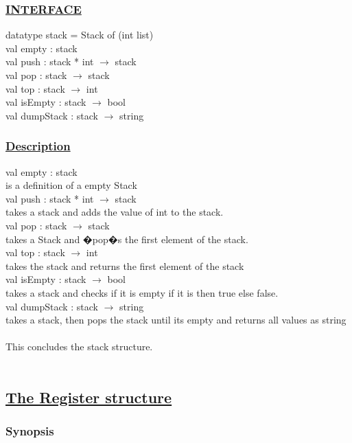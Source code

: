 \documentclass[a4paper]{article}
\begin{document}
\subsubsection{\uline{INTERFACE}}
	datatype stack = Stack of (int list)\\	
	val empty : stack \\
	val push : stack * int $\rightarrow$ stack\\					
	val pop : stack $\rightarrow$ stack\\						
	val top : stack $\rightarrow$ int\\						
	val isEmpty : stack $\rightarrow$ bool \\						
	val dumpStack : stack $\rightarrow$ string\\					 


\subsubsection{\uline{Description}}

	val empty : stack\\
		is a definition of a empty Stack
\\
	val push : stack * int $\rightarrow$ stack\\					
		takes a stack and adds the value of int to the stack.
\\
	val pop : stack $\rightarrow$ stack	\\					
		takes a Stack and �pop�s the first element of the stack.
\\
	val top : stack $\rightarrow$ int\\							
		takes the stack and returns the first element of the stack
\\
	val isEmpty : stack $\rightarrow$ bool\\						
		takes a stack and checks if it is empty if it is then true else false.
\\
	val dumpStack : stack $\rightarrow$ string\\
		takes a stack, then pops the stack until its empty and returns all values as string
\\
\\
This concludes the stack structure.
\\
\\
\subsection{\uline{The Register structure}}
\subsubsection{Synopsis}
\end{document}
